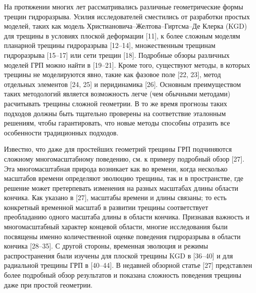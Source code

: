 \documentclass[main.tex]{subfiles}
\begin{document}
На протяжении многих лет рассматривались различные геометрические формы трещин гидроразрыва.
Усилия исследователей сместились от разработки простых моделей, таких как модель Христиановича–Желтова–Гиртсма–Де Клерка (KGD) для трещины в условиях плоской деформации [11], к более сложным моделям планарной трещины гидроразрыва [12–14], множественным трещинам гидроразрыва [15–17] или сети трещин [18].
Подробные обзоры различных моделей ГРП можно найти в [19–21].
Кроме того, существуют методы, в которых трещины не моделируются явно, такие как фазовое поле [22, 23], метод отдельных элементов [24, 25] и перидинамика [26].
Основным преимуществом таких методологий является возможность легче (чем обычными методами) расчитывать трещины сложной геометрии.
В то же время прогнозы таких подходов должны быть тщательно проверены на соответствие эталонным решениям, чтобы гарантировать, что новые методы способны отразить все особенности традиционных подходов.

Известно, что даже для простейших геометрий трещины ГРП подчиняются сложному многомасштабному поведению, см. к примеру подробный обзор [27].
Эта многомасштабная природа возникает как во времени, когда несколько масштабов времени определяют эволюцию трещины, так и в пространстве, где решение может претерпевать изменения на разных масштабах длины области кончика.
Как указано в [27], масштабы времени и длины связаны;
то есть конкретный временной масштаб в развитии трещины соответствует преобладанию одного масштаба длины в области кончика.
Признавая важность и многомасштабный характер концевой области, многие исследования были посвящены именно количественной оценке поведения гидроразрыва в области кончика [28–35].
С другой стороны, временная эволюция и режимы распространения были изучены для плоской трещины KGD в [36–40] и для радиальной трещины ГРП в [40–44].
В недавней обзорной статье [27] представлен более подробный обзор результатов и показана сложность поведения трещины даже при простой геометрии.
\end{document}

